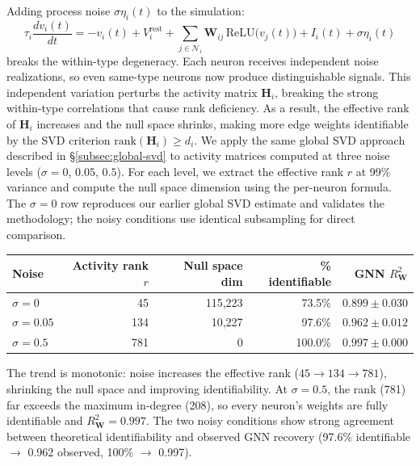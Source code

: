 \documentclass[11pt,a4paper]{article}
\begin{document}
Adding process noise $\sigma\eta_i(t)$ to the simulation:
\begin{equation}
\tau_i\frac{dv_i(t)}{dt} = -v_i(t) + V_i^{\text{rest}}
+ \sum_{j\in\mathcal{N}_i} \mathbf{W}_{ij}\,
  \text{ReLU}\!\big(v_j(t)\big)
+ I_i(t) + \sigma\eta_i(t)
\end{equation}
breaks the within-type degeneracy. Each neuron receives independent noise realizations, so even same-type neurons now produce distinguishable signals. This independent variation perturbs the activity matrix $\mathbf{H}_i$, breaking the strong within-type correlations that cause rank deficiency. As a result, the effective rank of $\mathbf{H}_i$ increases and the null space shrinks, making more edge weights identifiable by the SVD criterion $\text{rank}(\mathbf{H}_i) \geq d_i$.
 We apply the same global SVD approach described in \S\ref{subsec:global-svd} to activity matrices computed at three noise levels ($\sigma = 0$, $0.05$, $0.5$). For each level, we extract the effective rank $r$ at 99\% variance and compute the null space dimension using the per-neuron formula. The $\sigma = 0$ row reproduces our earlier global SVD estimate and validates the methodology; the noisy conditions use identical subsampling for direct comparison.

\begin{center}
\begin{tabular}{lrrrr}
\toprule
Noise & Activity rank $r$ & Null space dim & \% identifiable & GNN $R^2_{\mathbf{W}}$ \\
\midrule
$\sigma = 0$    & 45  & 115,223 & 73.5\%  & $0.899 \pm 0.030$ \\
$\sigma = 0.05$ & 134 & 10,227  & 97.6\%  & $0.962 \pm 0.012$ \\
$\sigma = 0.5$  & 781 & 0 & 100.0\% & $0.997 \pm 0.000$ \\
\bottomrule
\end{tabular}
\end{center}
The trend is monotonic: noise increases the effective rank ($45 \to 134 \to 781$), shrinking the null space and improving identifiability. At $\sigma = 0.5$, the rank (781) far exceeds the maximum in-degree (208), so every neuron's weights are fully identifiable and $R^2_{\mathbf{W}} = 0.997$. The two noisy conditions show strong agreement between theoretical identifiability and observed GNN recovery (97.6\% identifiable $\to$ 0.962 observed, 100\% $\to$ 0.997).
\end{document}
